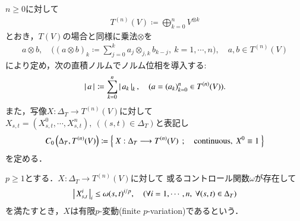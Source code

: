 	$n \geq 0$に対して
	\begin{align}
		T^{(n)}(V) \coloneqq \bigoplus_{k=0}^{n} V^{\otimes k}
	\end{align}
	とおき，$T(V)$の場合と同様に乗法$\otimes$を
	\begin{align}
		a \otimes b,\quad
		\Biggl((a \otimes b)_k \coloneqq \sum_{j=0}^{k} a_j \otimes_{j,k} b_{k-j},\ k=1,\cdots,n \Biggr),
		\quad a,b \in T^{(n)}(V)
	\end{align}
	により定め，次の直積ノルムでノルム位相を導入する:
	\begin{align}
		\left|\, a\, \right|_{} \coloneqq \sum_{k=0}^n \left|\, a_k\, \right|_{k},
		\quad (a = (a_k)_{k=0}^n \in T^{(n)}(V)).
		\label{eq:def_norm_on_truncated_tensor_algebra}
	\end{align}
	また，写像$X:\Delta_T \longrightarrow T^{(n)}(V)$に対して
	$X_{s,t} = (X^0_{s,t},\cdots,X^n_{s,t}),\ ((s,t) \in \Delta_T)$と表記し
	\begin{align}
		C_0 \left(\Delta_T,T^{(n)}(V) \right)
		\coloneqq \left\{\ X:\Delta_T \longrightarrow T^{(n)}(V)\ \, ; \quad \mbox{continuous},\ X^0 \equiv 1\ \right\}
	\end{align}
	を定める．
	
	\begin{screen}
		\begin{dfn}
			$p \geq 1$とする．$X:\Delta_T \longrightarrow T^{(n)}(V)$に対して
			或るコントロール関数$\omega$が存在して
			\begin{align}
				\left|\, X^i_{s,t}\, \right|_{i} \leq \omega(s,t)^{i/p},
				\quad (\forall i=1,\cdots,n,\ \forall (s,t) \in \Delta_T)
				\label{eq:def_finite_p_variation}
			\end{align}
			を満たすとき，$X$は有限$p$-変動(finite $p$-variation)であるという．\footnotemark
		\end{dfn}
	\end{screen}
	
